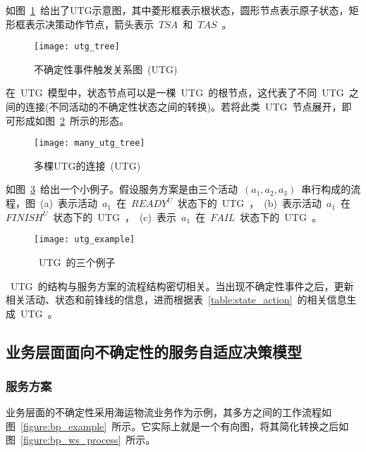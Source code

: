如图~\ref{figure:utg_tree}~给出了UTG示意图，其中菱形框表示根状态，圆形节点表示原子状态，矩形框表示决策动作节点，箭头表示~$TSA$~和~$TAS$~。

\begin{figure}[htbp]
    \centering
    \texttt{[image: utg\_tree]}
    \caption{不确定性事件触发关系图~(UTG)~}\label{figure:utg_tree}
    \vspace{-1em}
\end{figure}

在~UTG~模型中，状态节点可以是一棵~UTG~的根节点，这代表了不同~UTG~之间的连接(不同活动的不确定性状态之间的转换)。若将此类~UTG~节点展开，即可形成如图~\ref{figure:many_utg_tree}~所示的形态。

\begin{figure}[htbp]
    \centering
    \texttt{[image: many\_utg\_tree]}
    \caption{多棵UTG的连接~(UTG)~}\label{figure:many_utg_tree}
    \vspace{-1em}
\end{figure}

如图~\ref{figure:utg_example}~给出一个小例子。假设服务方案是由三个活动~$(a_1, a_2, a_3)$~串行构成的流程，图~(a)~表示活动~$a_1$~在~$READY^U$~状态下的~UTG~，~(b)~表示活动~$a_1$~在~$FINISH^U$~状态下的~UTG~，~(c)~表示~$a_1$~在~$FAIL$~状态下的~UTG~。

\begin{figure}[htbp]
    \centering
    \texttt{[image: utg\_example]}
    \caption{~UTG~的三个例子}\label{figure:utg_example}
    \vspace{-1em}
\end{figure}

~UTG~的结构与服务方案的流程结构密切相关。当出现不确定性事件之后，更新相关活动、状态和前锋线的信息，进而根据表~\ref{table:state_action}~的相关信息生成~UTG~。

\subsection{业务层面面向不确定性的服务自适应决策模型}

\subsubsection{服务方案}

%

业务层面的不确定性采用海运物流业务作为示例，其多方之间的工作流程如图~\ref{figure:bp_example}~所示。它实际上就是一个有向图，将其简化转换之后如图~\ref{figure:bp_ws_process}~所示。

